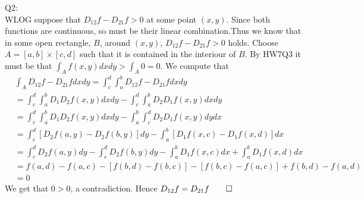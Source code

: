 \documentclass[letterpaper]{article}
\begin{document}
Q2:\\ WLOG suppose that $D_{12}f- D_{21}f>0$ at some point $(x,y)$. Since both functions are continuous, so must be their linear combination.Thus we know that in some open rectangle, $B$, around $(x,y)$, $D_{12}f- D_{21}f>0$ holds. Choose $A=[a,b]\times [c,d]$ such that it is contained in the interiour of $B$. By HW7Q3 it must be that $\int_A f(x,y)dxdy> \int_A 0 = 0$. We compute that 
\begin{align*}
    &\int_A D_{12}f- D_{21}f dx dy = \int_c^d \int_a^b D_{12}f- D_{21}f dx dy \tag{by Fubini's Theorem}
    \\ & = \int_c^d \int_a^b D_1D_2f(x,y) dx dy - \int_c^d \int_a^b D_2D_1f(x,y)dxdy \tag{by linearity of the integral}
    \\ & = \int_c^d \int_a^b D_1D_2f(x,y) dx dy - \int_a^b \int_c^d D_2D_1f(x,y)dydx \tag{by Fubini's Theorem}
    \\ & = \int_c^d [D_2f(a,y)-D_2f(b,y)]dy - \int_a^b[D_1f(x,c)-D_1f(x,d)]dx \tag{by FTC}
    \\ & = \int_c^d D_2f(a,y)dy - \int_c^d D_2f(b,y)dy - \int_a^b D_1f(x,c)dx + \int_a^b D_1f(x,d)dx \tag{By linearity of the integral}
    \\ & = f(a,d)-f(a,c)- [f(b,d)-f(b,c)] - [f(b,c)-f(a,c)] + f(b,d)-f(a,d) \tag{by FTC}
    \\ & = 0
\end{align*} We get that $0>0$, a contradiction. Hence $D_{12}f = D_{21}f \qed$
\end{document}
